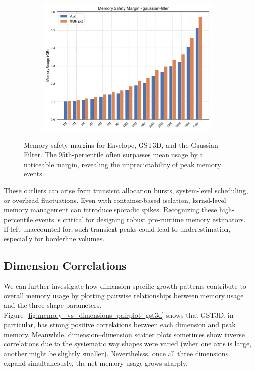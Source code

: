 \begin{figure}[htbp]
\begin{subfigure}[t]{0.49\textwidth}
        \includegraphics[width=\textwidth]{assets/images/05/memory_safety_margin_gaussian-filter}
    \end{subfigure}
    \caption{Memory safety margins for Envelope, \ac{GST3D}, and the Gaussian Filter. The 95th-percentile often surpasses mean usage by a noticeable margin, revealing the unpredictability of peak memory events.}
    \label{fig:memory_safety_margin}
\end{figure}

These outliers can arise from transient allocation bursts, system-level scheduling, or overhead fluctuations.
Even with container-based isolation, kernel-level memory management can introduce sporadic spikes.
Recognizing these high-percentile events is critical for designing robust pre-runtime memory estimators.
If left unaccounted for, such transient peaks could lead to underestimation, especially for borderline volumes.

\subsection{Dimension Correlations}
\label{subsec:dimension-correlations}

We can further investigate how dimension-specific growth patterns contribute to overall memory usage by plotting pairwise relationships between memory usage and the three shape parameters.
Figure~\ref{fig:memory_vs_dimensions_pairplot_gst3d} shows that \ac{GST3D}, in particular, has strong positive correlations between each dimension and peak memory.
Meanwhile, dimension--dimension scatter plots sometimes show inverse correlations due to the systematic way shapes were varied (when one axis is large, another might be slightly smaller).
Nevertheless, once all three dimensions expand simultaneously, the net memory usage grows sharply.

